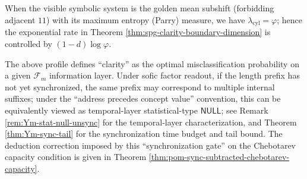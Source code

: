 \begin{remark}\label{rem:spg-golden-mean-specialization}
When the visible symbolic system is the golden mean subshift (forbidding adjacent $11$) with its maximum entropy (Parry) measure, we have $\lambda_{\mathrm{cyl}}=\varphi$;
hence the exponential rate in Theorem \ref{thm:spg-clarity-boundary-dimension} is controlled by $(1-d)\log\varphi$.
\end{remark}

\begin{remark}\label{rem:spg-sync-null-interface}
The above profile defines ``clarity'' as the optimal misclassification probability on a given $\mathcal{F}_m$ information layer.
Under sofic factor readout, if the length prefix has not yet synchronized, the same prefix may correspond to multiple internal suffixes; under the ``address precedes concept value'' convention, this can be equivalently viewed as temporal-layer statistical-type $\mathsf{NULL}$;
see Remark \ref{rem:Ym-stat-null-unsync} for the temporal-layer characterization, and Theorem \ref{thm:Ym-sync-tail} for the synchronization time budget and tail bound.
The deduction correction imposed by this ``synchronization gate'' on the Chebotarev capacity condition is given in Theorem \ref{thm:pom-sync-subtracted-chebotarev-capacity}.
\end{remark}

